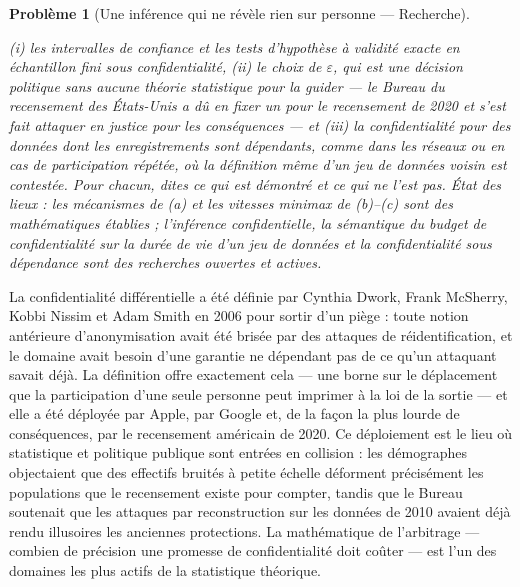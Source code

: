\documentclass[11pt]{article}
\newtheorem{problem}{Problème}
\begin{document}
\begin{problem}[{Une inférence qui ne révèle rien sur personne --- Recherche}]
\begin{enumerate}
(i) les intervalles de confiance et les tests d'hypothèse à validité exacte en échantillon fini
sous confidentialité, (ii) le choix de $ \varepsilon $, qui est une décision politique sans
aucune théorie statistique pour la guider --- le Bureau du recensement des États-Unis a dû en fixer
un pour le recensement de 2020 et s'est fait attaquer en justice pour les conséquences --- et
(iii) la confidentialité pour des données dont les enregistrements sont dépendants, comme dans les
réseaux ou en cas de participation répétée, où la définition même d'un \og{} jeu de données voisin \fg{}
est contestée. Pour chacun, dites ce qui est démontré et ce qui ne l'est pas.
\textit{État des lieux : les mécanismes de (a) et les vitesses minimax de (b)--(c) sont des mathématiques
établies ; l'inférence confidentielle, la sémantique du budget de confidentialité sur la durée de
vie d'un jeu de données et la confidentialité sous dépendance sont des recherches ouvertes et
actives.}
\end{enumerate}

\end{problem}

\noindent La confidentialité différentielle a été définie par Cynthia Dwork, Frank
McSherry, Kobbi Nissim et Adam Smith en 2006 pour sortir d'un piège : toute notion antérieure
d'anonymisation avait été brisée par des attaques de réidentification, et le domaine avait besoin
d'une garantie ne dépendant pas de ce qu'un attaquant savait déjà. La définition offre exactement
cela --- une borne sur le déplacement que la participation d'une seule personne peut imprimer à la loi
de la sortie --- et elle a été déployée par Apple, par Google et, de la façon la plus lourde de
conséquences, par le recensement américain de 2020. Ce déploiement est le lieu où statistique et
politique publique sont entrées en collision : les démographes objectaient que des effectifs bruités
à petite échelle déforment précisément les populations que le recensement existe pour compter,
tandis que le Bureau soutenait que les attaques par reconstruction sur les données de 2010 avaient
déjà rendu illusoires les anciennes protections. La mathématique de l'arbitrage --- combien de
précision une promesse de confidentialité doit coûter --- est l'un des domaines les plus actifs de la
statistique théorique.
\end{document}
